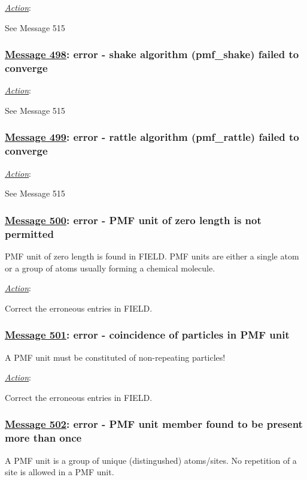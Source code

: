 \noindent \underline{\em Action}:

See Message 515

\subsubsection*{\underline{Message 498}: error - shake algorithm (pmf\_shake) failed to converge}

\noindent \underline{\em Action}:

See Message 515

\subsubsection*{\underline{Message 499}: error - rattle algorithm (pmf\_rattle) failed to converge}

\noindent \underline{\em Action}:

See Message 515

\subsubsection*{\underline{Message 500}: error - PMF unit of zero length is not permitted}

PMF unit of zero length is found in FIELD.  PMF units are either a
single atom or a group of atoms usually forming a chemical molecule.

\noindent \underline{\em Action}:

Correct the erroneous entries in FIELD.

\subsubsection*{\underline{Message 501}: error - coincidence of particles in PMF unit}

A PMF unit must be constituted of non-repeating particles!

\noindent \underline{\em Action}:

Correct the erroneous entries in FIELD.

\subsubsection*{\underline{Message 502}: error - PMF unit member found to be present more than once}

A PMF unit is a group of unique (distingushed) atoms/sites. No
repetition of a site is allowed in a PMF unit.

